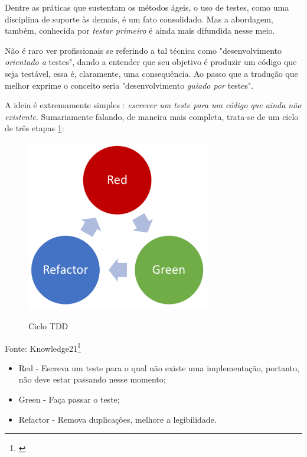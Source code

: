 \documentclass[12pt,a4paper,oneside,english,brazil]{article}
\begin{document}
      Dentre as práticas que sustentam os métodos ágeis, o uso de testes, como
      uma disciplina de suporte às demais, é um fato consolidado. Mas a
      abordagem, também, conhecida por \emph{testar primeiro} é ainda mais
      difundida nesse  meio.

      Não é raro ver profissionais se referindo a tal técnica como
      "desenvolvimento \emph{orientado a} testes", dando a entender que seu
      objetivo é produzir um código que seja testável, essa é, claramente, uma
      consequência. Ao passo que a tradução que melhor exprime o conceito seria
      "desenvolvimento \emph{guiado por} testes".

      A ideia é extremamente simples \cite[p.1]{FreemanPryce2009}: \emph{escrever um
      teste para um código que ainda não existente}. Sumariamente falando, de
      maneira mais completa, trata-se de um ciclo de três etapas
      \ref{fig:ciclotdd}:

      \begin{center}
        \begin{figure}[htb]
          \centering
          \caption{Ciclo TDD}
          \includegraphics[width=8cm]{ciclo-tdd}
          \label{fig:ciclotdd}
        \end{figure}
        Fonte: Knowledge21\footnote{\cite{Ferreira2018}}
      \end{center}

      \begin{itemize}
        \item Red - Escreva um teste para o qual não existe uma
          implementação, portanto, não deve estar passando nesse
          momento;
        \item Green - Faça passar o teste;
        \item Refactor - Remova duplicações,  melhore a legibilidade.
      \end{itemize}
\end{document}
